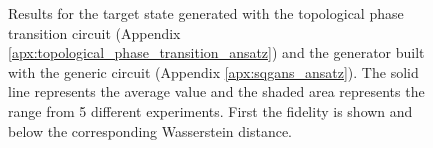 \begin{figure}[htbp!]

  \caption{Results for the target state generated with the topological phase
    transition circuit (Appendix \ref{apx:topological_phase_transition_ansatz})
    and the generator built with the generic circuit (Appendix \ref{apx:sqgans_ansatz}).
    The solid line represents the average value and the shaded area
    represents the range from 5 different experiments. First the
    fidelity is shown and below the corresponding Wasserstein distance.}
  \label{fig:wqgans_phase_res_3}
\end{figure}


